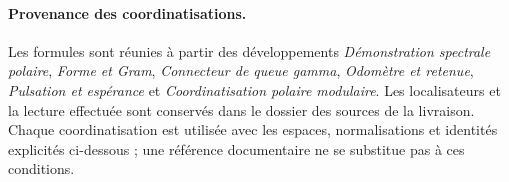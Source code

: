 \paragraph{Provenance des coordinatisations.}
Les formules sont réunies à partir des développements \emph{Démonstration spectrale polaire}, \emph{Forme et Gram}, \emph{Connecteur de queue gamma}, \emph{Odomètre et retenue}, \emph{Pulsation et espérance} et \emph{Coordinatisation polaire modulaire}. Les localisateurs et la lecture effectuée sont conservés dans le dossier des sources de la livraison. Chaque coordinatisation est utilisée avec les espaces, normalisations et identités explicités ci-dessous ; une référence documentaire ne se substitue pas à ces conditions.

